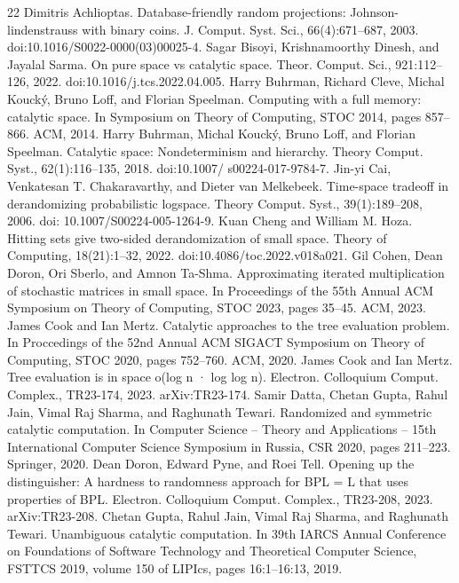 \begin{thebibliography}{22}
 Dimitris Achlioptas. Database-friendly random projections: Johnson-lindenstrauss with binary coins. J. Comput. Syst. Sci., 66(4):671–687, 2003. doi:10.1016/S0022-0000(03)00025-4.
 Sagar Bisoyi, Krishnamoorthy Dinesh, and Jayalal Sarma. On pure space vs catalytic space. Theor. Comput. Sci., 921:112–126, 2022. doi:10.1016/j.tcs.2022.04.005.
 Harry Buhrman, Richard Cleve, Michal Koucký, Bruno Loff, and Florian Speelman. Computing with a full memory: catalytic space. In Symposium on Theory of Computing, STOC 2014, pages 857–866. ACM, 2014.
 Harry Buhrman, Michal Koucký, Bruno Loff, and Florian Speelman. Catalytic space: Nondeterminism and hierarchy. Theory Comput. Syst., 62(1):116–135, 2018. doi:10.1007/ s00224-017-9784-7.
 Jin-yi Cai, Venkatesan T. Chakaravarthy, and Dieter van Melkebeek. Time-space tradeoff in derandomizing probabilistic logspace. Theory Comput. Syst., 39(1):189–208, 2006. doi: 10.1007/S00224-005-1264-9.
 Kuan Cheng and William M. Hoza. Hitting sets give two-sided derandomization of small space. Theory of Computing, 18(21):1–32, 2022. doi:10.4086/toc.2022.v018a021.
 Gil Cohen, Dean Doron, Ori Sberlo, and Amnon Ta-Shma. Approximating iterated multiplication of stochastic matrices in small space. In Proceedings of the 55th Annual ACM Symposium on Theory of Computing, STOC 2023, pages 35–45. ACM, 2023.
 James Cook and Ian Mertz. Catalytic approaches to the tree evaluation problem. In Proccedings of the 52nd Annual ACM SIGACT Symposium on Theory of Computing, STOC 2020, pages 752–760. ACM, 2020.
 James Cook and Ian Mertz. Tree evaluation is in space o(log n · log log n). Electron. Colloquium Comput. Complex., TR23-174, 2023. arXiv:TR23-174.
 Samir Datta, Chetan Gupta, Rahul Jain, Vimal Raj Sharma, and Raghunath Tewari. Randomized and symmetric catalytic computation. In Computer Science – Theory and Applications – 15th International Computer Science Symposium in Russia, CSR 2020, pages 211–223. Springer, 2020.
 Dean Doron, Edward Pyne, and Roei Tell. Opening up the distinguisher: A hardness to randomness approach for BPL = L that uses properties of BPL. Electron. Colloquium Comput. Complex., TR23-208, 2023. arXiv:TR23-208.
 Chetan Gupta, Rahul Jain, Vimal Raj Sharma, and Raghunath Tewari. Unambiguous catalytic computation. In 39th IARCS Annual Conference on Foundations of Software Technology and Theoretical Computer Science, FSTTCS 2019, volume 150 of LIPIcs, pages 16:1–16:13, 2019.

\end{thebibliography}
